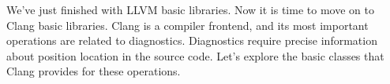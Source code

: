 We’ve just finished with LLVM basic libraries. Now it is time to move on to Clang basic libraries. Clang is a compiler frontend, and its most important operations are related to diagnostics. Diagnostics require precise information about position location in the source code. Let’s explore the basic classes that Clang provides for these operations.


















































































